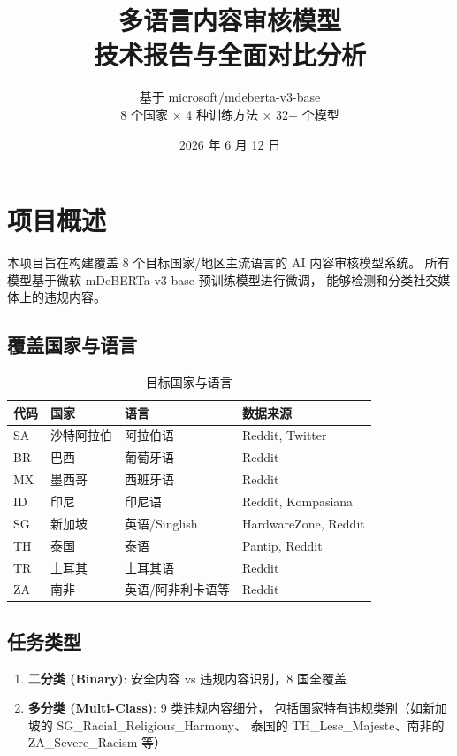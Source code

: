 \documentclass[11pt,a4paper]{article}
\title{\textbf{多语言内容审核模型\\技术报告与全面对比分析}}
\author{基于 microsoft/mdeberta-v3-base \\ 8 个国家 × 4 种训练方法 × 32+ 个模型}
\date{2026 年 6 月 12 日}
\begin{document}
\maketitle
\tableofcontents
\newpage

\section{项目概述}

本项目旨在构建覆盖 8 个目标国家/地区主流语言的 AI 内容审核模型系统。
所有模型基于微软 mDeBERTa-v3-base 预训练模型进行微调，
能够检测和分类社交媒体上的违规内容。

\subsection{覆盖国家与语言}

\begin{table}[h]\centering
\caption{目标国家与语言}\label{tab:countries}
\begin{tabular}{@{}llll@{}}
\toprule
\textbf{代码} & \textbf{国家} & \textbf{语言} & \textbf{数据来源} \\
\midrule
SA & 沙特阿拉伯 & 阿拉伯语 & Reddit, Twitter \\
BR & 巴西 & 葡萄牙语 & Reddit \\
MX & 墨西哥 & 西班牙语 & Reddit \\
ID & 印尼 & 印尼语 & Reddit, Kompasiana \\
SG & 新加坡 & 英语/Singlish & HardwareZone, Reddit \\
TH & 泰国 & 泰语 & Pantip, Reddit \\
TR & 土耳其 & 土耳其语 & Reddit \\
ZA & 南非 & 英语/阿非利卡语等 & Reddit \\
\bottomrule
\end{tabular}
\end{table}

\subsection{任务类型}

\begin{enumerate}[itemsep=0pt]
\item \textbf{二分类 (Binary)}: 安全内容 vs 违规内容识别，8 国全覆盖
\item \textbf{多分类 (Multi-Class)}: 9 类违规内容细分，
包括国家特有违规类别（如新加坡的 SG\_Racial\_Religious\_Harmony、
泰国的 TH\_Lese\_Majeste、南非的 ZA\_Severe\_Racism 等）
\end{enumerate}
\end{document}
